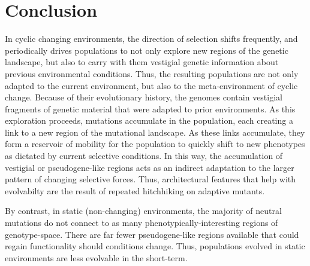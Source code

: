 \documentclass[PhD]{msu-thesis}
\begin{document}

\section{Conclusion}
In cyclic changing environments, the direction of selection shifts frequently, and periodically drives populations to not only explore new regions of the genetic landscape, but also to carry with them vestigial genetic information about previous environmental conditions. Thus, the resulting populations are not only adapted to the current environment, but also to the meta-environment of cyclic change. Because of their evolutionary history, the genomes contain vestigial fragments of genetic material that were adapted to prior environments. As this exploration proceeds, mutations accumulate in the population, each creating a link to a new region of the mutational landscape. As these links accumulate, they form a reservoir of mobility for the population to quickly shift to new phenotypes as dictated by current selective conditions. In this way, the accumulation of vestigial or pseudogene-like regions acts as an indirect adaptation to the larger pattern of changing selective forces. 
Thus, architectural features that help with evolvabilty are the result of repeated hitchhiking on adaptive mutants.

By contrast, in static (non-changing) environments, the majority of neutral mutations do not connect to as many phenotypically-interesting regions of genotype-space. There are far fewer pseudogene-like regions available that could regain functionality should conditions change. Thus, populations evolved in static environments are less evolvable in the short-term.
\end{document}
